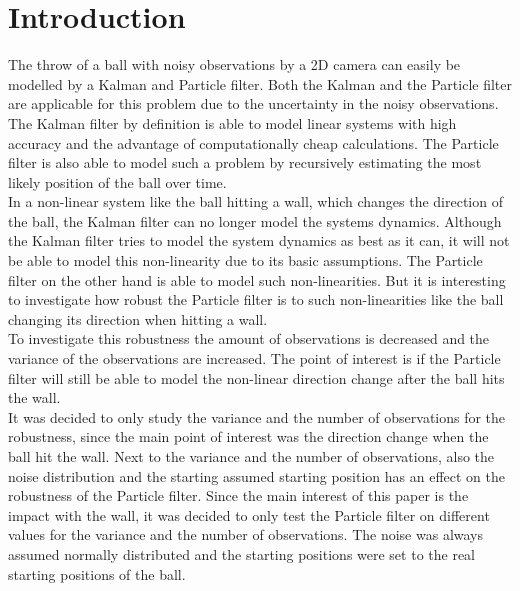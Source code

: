 \documentclass[conference]{IEEEtran}
\begin{document}
\section{Introduction}
The throw of a ball with noisy observations by a 2D camera can easily be modelled by a Kalman and Particle filter. 
Both the Kalman and the Particle filter are applicable for this problem due to the uncertainty in the noisy observations.
The Kalman filter by definition is able to model linear systems with high accuracy and the advantage of computationally cheap calculations. 
The Particle filter is also able to model such a problem by recursively estimating the most likely position of the ball over time. \\
In a non-linear system like the ball hitting a wall, which changes the direction of the ball, the Kalman filter can no longer model the systems dynamics.  
Although the Kalman filter tries to model the system dynamics as best as it can, it will not be able to model this non-linearity due to its basic assumptions. 
The Particle filter on the other hand is able to model such non-linearities. 
But it is interesting to investigate how robust the Particle filter is to such non-linearities like the ball changing its direction when hitting a wall. \\
To investigate this robustness the amount of observations is decreased and the variance of the observations are increased. 
The point of interest is if the Particle filter will still be able to model the non-linear direction change after the ball hits the wall. \\
It was decided to only study the variance and the number of observations for the robustness, since the main point of interest was the direction change when the ball hit the wall.
Next to the variance and the number of observations, also the noise distribution and the starting assumed starting position has an effect on the robustness of the Particle filter.
Since the main interest of this paper is the impact with the wall, it was decided to only test the Particle filter on different values for the variance and the number of observations.
The noise was always assumed normally distributed and the starting positions were set to the real starting positions of the ball. 


\end{document}
